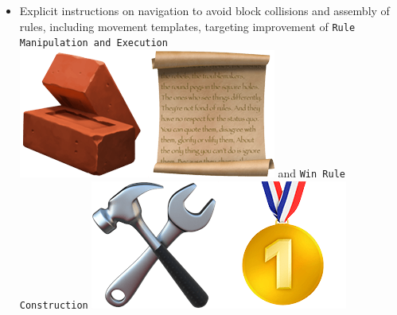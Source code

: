 \begin{itemize}
	\item Explicit instructions on navigation to avoid block collisions and assembly
		of rules, including movement templates, targeting improvement of \texttt{Rule
		Manipulation and Execution}
		\includegraphics[scale=0.07]{figs/emojis/emoji_7.png}
		and \texttt{Win Rule Construction}
		\includegraphics[scale=0.07]{figs/emojis/emoji_5.png}
\end{itemize}

